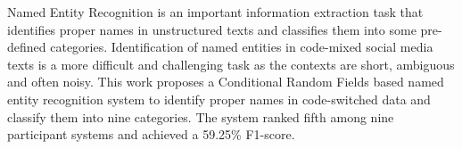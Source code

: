 Named Entity Recognition is an important information extraction task that identifies proper names in  unstructured texts and classifies them into some pre-defined categories. Identification of named entities in code-mixed social media texts is a more difficult and challenging task as the contexts are short, ambiguous and often noisy. This work proposes a Conditional Random Fields based named entity recognition system to identify proper names in code-switched data and classify them into nine categories. The system ranked fifth among nine participant systems and achieved a 59.25\% F1-score.
